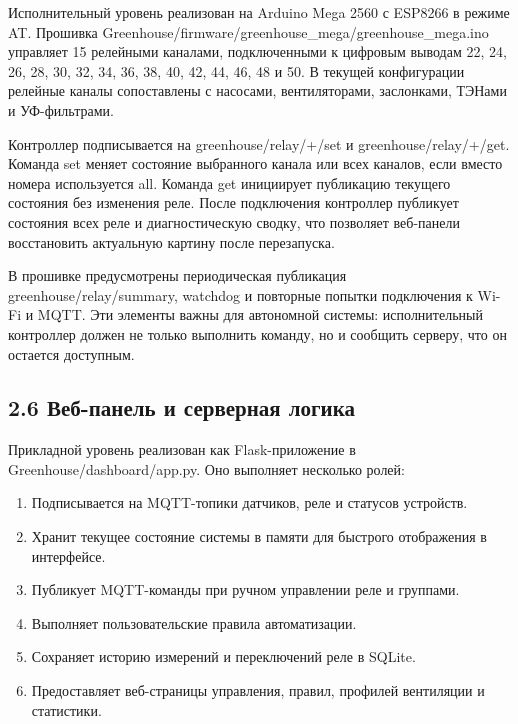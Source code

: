 \documentclass[a4paper,14pt]{extarticle}
\renewcommand{\texttt}[1]{\textnormal{#1}}
\providecommand{\tightlist}{%
  \setlength{\itemsep}{0pt}\setlength{\parskip}{0pt}}
\begin{document}
Исполнительный уровень реализован на Arduino Mega 2560 с ESP8266 в
режиме AT. Прошивка
\texttt{Greenhouse/firmware/greenhouse\_mega/greenhouse\_mega.ino}
управляет 15 релейными каналами, подключенными к цифровым выводам 22,
24, 26, 28, 30, 32, 34, 36, 38, 40, 42, 44, 46, 48 и 50. В текущей
конфигурации релейные каналы сопоставлены с насосами, вентиляторами,
заслонками, ТЭНами и УФ-фильтрами.

Контроллер подписывается на \texttt{greenhouse/relay/+/set} и
\texttt{greenhouse/relay/+/get}. Команда \texttt{set} меняет состояние
выбранного канала или всех каналов, если вместо номера используется
\texttt{all}. Команда \texttt{get} инициирует публикацию текущего
состояния без изменения реле. После подключения контроллер публикует
состояния всех реле и диагностическую сводку, что позволяет веб-панели
восстановить актуальную картину после перезапуска.

В прошивке предусмотрены периодическая публикация
\texttt{greenhouse/relay/summary}, watchdog и повторные попытки
подключения к Wi-Fi и MQTT. Эти элементы важны для автономной системы:
исполнительный контроллер должен не только выполнить команду, но и
сообщить серверу, что он остается доступным.

\subsection{2.6 Веб-панель и серверная
логика}\label{ux432ux435ux431-ux43fux430ux43dux435ux43bux44c-ux438-ux441ux435ux440ux432ux435ux440ux43dux430ux44f-ux43bux43eux433ux438ux43aux430}

Прикладной уровень реализован как Flask-приложение в
\texttt{Greenhouse/dashboard/app.py}. Оно выполняет несколько ролей:

\begin{enumerate}
\def\labelenumi{\arabic{enumi})}
\tightlist
\item
  Подписывается на MQTT-топики датчиков, реле и статусов устройств.
\item
  Хранит текущее состояние системы в памяти для быстрого отображения в
  интерфейсе.
\item
  Публикует MQTT-команды при ручном управлении реле и группами.
\item
  Выполняет пользовательские правила автоматизации.
\item
  Сохраняет историю измерений и переключений реле в SQLite.
\item
  Предоставляет веб-страницы управления, правил, профилей вентиляции и
  статистики.
\end{enumerate}
\end{document}
